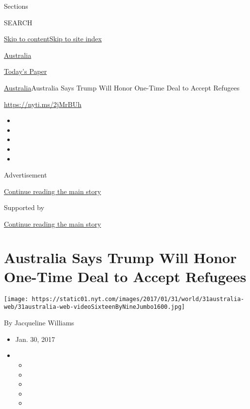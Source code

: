 Sections

SEARCH

\protect\hyperlink{site-content}{Skip to
content}\protect\hyperlink{site-index}{Skip to site index}

\href{https://www.nytimes.com/section/world/australia}{Australia}

\href{https://myaccount.nytimes.com/auth/login?response_type=cookie\&client_id=vi}{}

\href{https://www.nytimes.com/section/todayspaper}{Today's Paper}

\href{/section/world/australia}{Australia}\textbar{}Australia Says Trump
Will Honor One-Time Deal to Accept Refugees

\url{https://nyti.ms/2jMrBUh}

\begin{itemize}
\item
\item
\item
\item
\item
\end{itemize}

Advertisement

\protect\hyperlink{after-top}{Continue reading the main story}

Supported by

\protect\hyperlink{after-sponsor}{Continue reading the main story}

\hypertarget{australia-says-trump-will-honor-one-time-deal-to-accept-refugees}{%
\section{Australia Says Trump Will Honor One-Time Deal to Accept
Refugees}\label{australia-says-trump-will-honor-one-time-deal-to-accept-refugees}}

\texttt{[image: https://static01.nyt.com/images/2017/01/31/world/31australia-web/31australia-web-videoSixteenByNineJumbo1600.jpg]}

By Jacqueline Williams

\begin{itemize}
\item
  Jan. 30, 2017
\item
  \begin{itemize}
  \item
  \item
  \item
  \item
  \item
  \end{itemize}
\end{itemize}

